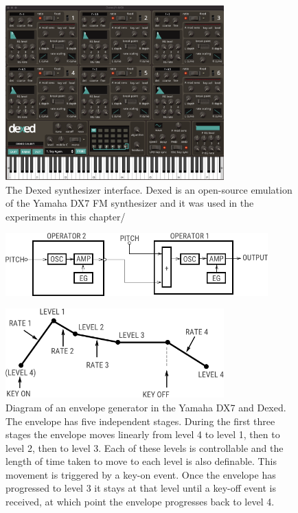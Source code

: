 \begin{figure}[ht]
    \centering
    \includegraphics[width=0.75\textwidth]{figures/spiegelib/dexed.png}
    \caption{The Dexed synthesizer interface. Dexed is an open-source emulation of the Yamaha DX7 FM synthesizer and it was used in the experiments in this chapter/}
    \label{fig:dexed}
\end{figure}

\begin{figure}[ht]
    \centering
    \includegraphics[width=0.9\textwidth]{figures/spiegelib/two_op_fm_block.png}
    \caption{}
    \label{fig:two_op_fm_block}
\end{figure}

\begin{figure}[ht]
    \centering
    \includegraphics[width=0.75\textwidth]{figures/spiegelib/Yamaha DX7 Envelope.png}
    \caption{Diagram of an envelope generator in the Yamaha DX7 and Dexed. The envelope has five independent stages. During the first three stages the envelope moves linearly from level 4 to level 1, then to level 2, then to level 3. Each of these levels is controllable and the length of time taken to move to each level is also definable. This movement is triggered by a key-on event. Once the envelope has progressed to level 3 it stays at that level until a key-off event is received, at which point the envelope progresses back to level 4.}
    \label{fig:dx7_envelope}
\end{figure}

